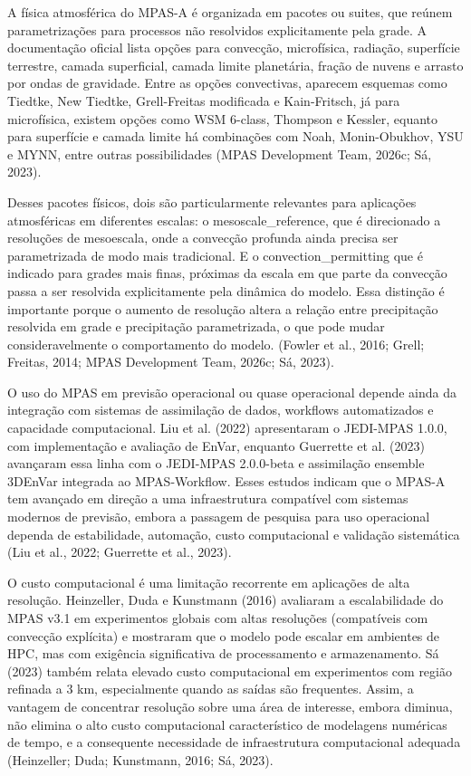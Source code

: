 \documentclass[12pt,a4paper,oneside]{book}
\begin{document}
A física atmosférica do MPAS-A é organizada em pacotes ou suites, que reúnem parametrizações para processos não resolvidos explicitamente pela grade. A documentação oficial lista opções para convecção, microfísica, radiação, superfície terrestre, camada superficial, camada limite planetária, fração de nuvens e arrasto por ondas de gravidade. Entre as opções convectivas, aparecem esquemas como Tiedtke, New Tiedtke, Grell-Freitas modificada e Kain-Fritsch, já para microfísica, existem opções como WSM 6-class, Thompson e Kessler, equanto para superfície e camada limite há combinações com Noah, Monin-Obukhov, YSU e MYNN, entre outras possibilidades (MPAS Development Team, 2026c; Sá, 2023).

Desses pacotes físicos, dois são particularmente relevantes para aplicações atmosféricas em diferentes escalas: o mesoscale\_reference, que é direcionado a resoluções de mesoescala, onde a convecção profunda ainda precisa ser parametrizada de modo mais tradicional. E o convection\_permitting que é indicado para grades mais finas, próximas da escala em que parte da convecção passa a ser resolvida explicitamente pela dinâmica do modelo. Essa distinção é importante porque o aumento de resolução altera a relação entre precipitação resolvida em grade e precipitação parametrizada, o que pode mudar consideravelmente o comportamento do modelo. (Fowler et al., 2016; Grell; Freitas, 2014; MPAS Development Team, 2026c; Sá, 2023).

O uso do MPAS em previsão operacional ou quase operacional depende ainda da integração com sistemas de assimilação de dados, workflows automatizados e capacidade computacional. Liu et al. (2022) apresentaram o JEDI-MPAS 1.0.0, com implementação e avaliação de EnVar, enquanto Guerrette et al. (2023) avançaram essa linha com o JEDI-MPAS 2.0.0-beta e assimilação ensemble 3DEnVar integrada ao MPAS-Workflow. Esses estudos indicam que o MPAS-A tem avançado em direção a uma infraestrutura compatível com sistemas modernos de previsão, embora a passagem de pesquisa para uso operacional dependa de estabilidade, automação, custo computacional e validação sistemática (Liu et al., 2022; Guerrette et al., 2023).

O custo computacional é uma limitação recorrente em aplicações de alta resolução. Heinzeller, Duda e Kunstmann (2016) avaliaram a escalabilidade do MPAS v3.1 em experimentos globais com altas resoluções (compatíveis com convecção explícita) e mostraram que o modelo pode escalar em ambientes de HPC, mas com exigência significativa de processamento e armazenamento. Sá (2023) também relata elevado custo computacional em experimentos com região refinada a 3 km, especialmente quando as saídas são frequentes. Assim, a vantagem de concentrar resolução sobre uma área de interesse, embora diminua, não elimina o alto custo computacional característico de modelagens numéricas de tempo, e a consequente necessidade de infraestrutura computacional adequada (Heinzeller; Duda; Kunstmann, 2016; Sá, 2023).
\end{document}
